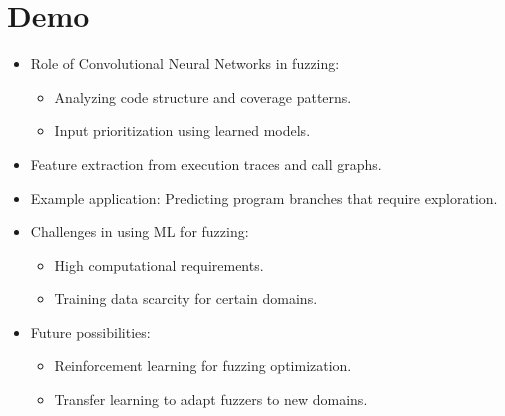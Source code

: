\section{Demo}\label{sec:demo}
\begin{itemize}
    \item Role of Convolutional Neural Networks in fuzzing:
    \begin{itemize}
        \item Analyzing code structure and coverage patterns.
        \item Input prioritization using learned models.
    \end{itemize}
        \item Feature extraction from execution traces and call graphs.
        \item Example application: Predicting program branches that require exploration.
\end{itemize}

\begin{itemize}
    \item Challenges in using ML for fuzzing:
    \begin{itemize}
        \item High computational requirements.
        \item Training data scarcity for certain domains.
    \end{itemize}
    \item Future possibilities:
    \begin{itemize}
        \item Reinforcement learning for fuzzing optimization.
        \item Transfer learning to adapt fuzzers to new domains.
    \end{itemize}
\end{itemize}
